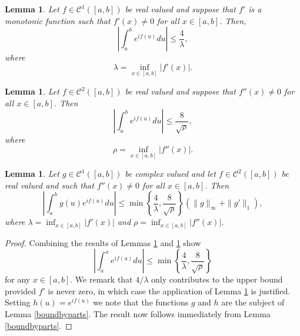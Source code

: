 \documentclass{article}
\theoremstyle{theorem}
\newtheorem{lemma}[theorem]{Lemma}
\theoremstyle{remark}
\begin{document}
\begin{lemma}\label{fprimebound}
Let $f\in\mathcal{C}^1([a,b])$ be real valued and suppose that $f'$ is a monotonic function such that $f'(x)\neq0$ for all $x\in[a,b]$. 
Then,
\begin{equation}
\left|\int_a^b e^{if(u)}du\right|\leq \frac{4}{\lambda},
\end{equation}
where
\begin{equation}
\lambda=\inf_{x\in [a,b]}|f'(x)|.
\end{equation} 
\end{lemma}

\begin{lemma}\label{fdoubleprimebound}
Let $f\in\mathcal{C}^2([a,b])$ be real valued and suppose that $f''(x)\neq 0$ for all $x\in[a,b]$. Then
\begin{equation*}
\left|\int_a^b e^{if(u)}du\right|\leq \frac{8}{\sqrt{\rho}},
\end{equation*}
where
\begin{equation*}
 \rho=\inf_{x\in[a,b]}|f''(x)|.
\end{equation*}
\end{lemma}



\begin{lemma}\label{minbound}
Let $g\in\mathcal{C}^1([a,b])$ be
complex valued and let $f\in \mathcal{C}^2([a,b])$ be real valued and such that $f''(x)\neq 0$ for all $x\in[a,b]$. Then
\begin{equation*}
\left|\int_a^bg(u)e^{if(u)}du\right|\leq
\min\left\{\frac{4}{\lambda},\frac{8}{\sqrt{\rho}}\right\}\left(\|g\|_{\infty}
+\|g'\|_1\right),
\end{equation*}
where $\lambda=\inf_{x\in[a,b]}|f'(x)|$ and $\rho=\inf_{x\in[a,b]}|f''(x)|$.
\end{lemma}
\begin{proof}
Combining the results of Lemmas \ref{fprimebound} and \ref{fdoubleprimebound} show
\begin{equation*}
\left|\int_a^x e^{if(u)}du\right|\leq \min\left\{\frac{4}{\lambda},\frac{8}{\sqrt{\rho}}\right\}
\end{equation*} for any $x\in[a,b]$. We remark that $4/\lambda$ only
contributes to the upper bound provided $f'$ is never zero, in which case the
application of Lemma \ref{fprimebound} is justified. Setting $h(u)=e^{if(u)}$ we
note that the functions $g$ and $h$ are the subject of Lemma \ref{boundbyparts}.
The result now follows immediately from Lemma \ref{boundbyparts}.
\end{proof}
\end{document}
